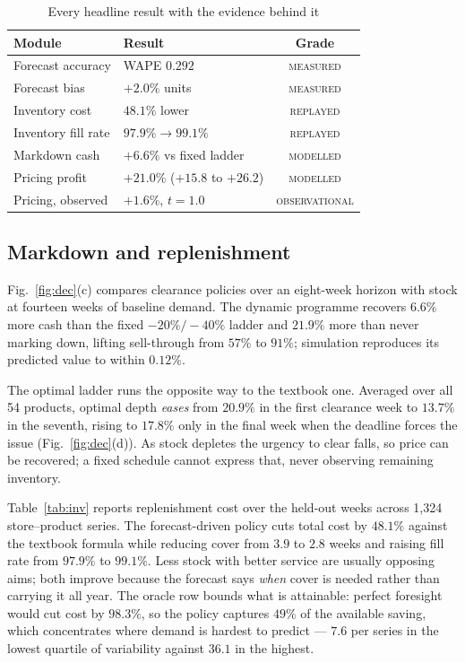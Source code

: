 \documentclass[conference,a4paper]{IEEEtran}
\begin{document}
\begin{table}[!t]
\caption{Every headline result with the evidence behind it}
\label{tab:ledger}
\centering
\footnotesize
\begin{tabular}{llc}
\toprule
Module & Result & Grade \\
\midrule
Forecast accuracy    & WAPE $0.292$              & \textsc{measured} \\
Forecast bias        & $+2.0\%$ units            & \textsc{measured} \\
Inventory cost       & $48.1\%$ lower            & \textsc{replayed} \\
Inventory fill rate  & $97.9\% \to 99.1\%$       & \textsc{replayed} \\
Markdown cash        & $+6.6\%$ vs fixed ladder  & \textsc{modelled} \\
Pricing profit       & $+21.0\%$ ($+15.8$ to $+26.2$) & \textsc{modelled} \\
Pricing, observed    & $+1.6\%$, $t=1.0$         & \textsc{observational} \\
\bottomrule
\end{tabular}
\end{table}

\subsection{Markdown and replenishment}
Fig.~\ref{fig:dec}(c) compares clearance policies over an eight-week horizon with
stock at fourteen weeks of baseline demand. The dynamic programme recovers $6.6\%$
more cash than the fixed $-20\%/-40\%$ ladder and $21.9\%$ more than never marking
down, lifting sell-through from $57\%$ to $91\%$; simulation reproduces its
predicted value to within $0.12\%$.

The optimal ladder runs the opposite way to the textbook one. Averaged over all 54
products, optimal depth \emph{eases} from $20.9\%$ in the first clearance week to
$13.7\%$ in the seventh, rising to $17.8\%$ only in the final week when the
deadline forces the issue (Fig.~\ref{fig:dec}(d)). As stock depletes the urgency to
clear falls, so price can be recovered; a fixed schedule cannot express that, never
observing remaining inventory.

Table~\ref{tab:inv} reports replenishment cost over the held-out weeks across
1{,}324 store--product series. The forecast-driven policy cuts total cost by
$48.1\%$ against the textbook formula while reducing cover from $3.9$ to $2.8$
weeks and raising fill rate from $97.9\%$ to $99.1\%$. Less stock with better
service are usually opposing aims; both improve because the forecast says
\emph{when} cover is needed rather than carrying it all year. The oracle row
bounds what is attainable: perfect foresight would cut cost by $98.3\%$, so the
policy captures $49\%$ of the available saving, which concentrates where demand is
hardest to predict --- $7.6$ per series in the lowest quartile of variability
against $36.1$ in the highest.
\end{document}
